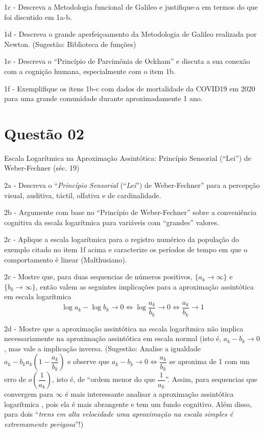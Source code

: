     1c - Descreva a Metodologia funcional de Galileo e justifique-a em termos do que foi discutido em 1a-b.

    1d - Descreva o grande aperfeiçoamento da Metodologia de Galileo realizada por Newton. (Sugestão: Biblioteca de funções)

    1e - Descreva o ``Princípio de Parcimônia de Ockham'' e discuta a sua conexão com a cognição humana, especialmente com o item 1b.

    1f - Exemplifique os itens 1b-c com dados de mortalidade da COVID19 em 2020 para uma grande comunidade durante aproximadamente 1 ano.






\section*{Questão 02}



Escala Logarítmica na Aproximação Assintótica: Princípio Sensorial (``Lei'') de
Weber-Fechner (séc. 19)

    2a - Descreva o ``\textit{Princípio Sensorial} (``\textit{Lei}'') de Weber-Fechner'' para a percepção visual, auditiva, táctil, olfativa e de cardinalidade.

    2b - Argumente com base no ``Princípio de Weber-Fechner'' sobre a conveniência cognitiva da escala logarítmica para variáveis com ``grandes'' valores.
    
    2c - Aplique a escala logarítmica para o registro numérico da população do exemplo citado no item 1f acima e caracterize os períodos de tempo em que o comportamento é linear (Malthusiano).

    2c - Mostre que, para duas sequencias de números positivos, \(\{a_k \to \infty\}\) e \(\{b_k \to \infty\}\), então valem as seguintes implicações para a aproximação assintótica em escala logarítmica
    \[\log a_k - \log b_k \to 0 \Leftrightarrow \log \dfrac{a_k}{b_k} \to 0 \Leftrightarrow \dfrac{a_k}{b_k} \to 1\]

    2d - Mostre que a aproximação assintótica na escala logarítmica  não implica necessariamente na aproximação assintótica em escala normal (isto é, \(a_k - b_k \to 0\), mas vale a implicação inversa. (Sugestão: Analise a igualdade \(a_k - b_k  a_k \left(1 - \dfrac{a_k}{b_k}\right)\) e observe que \(a_k - b_k \to 0 \Leftrightarrow \dfrac{a_k}{b_k}\) se aproxima de 1 com um erro de \(o\left(\dfrac{1}{a_k}\right)\), isto é, de ``ordem menor do que \(\dfrac{1}{a_k}\)''. Assim, para sequencias que convergem para \(\infty\) é mais interessante analisar a aproximação assintótica logarítmica , pois ela é mais abrangente e tem um fundo cognitivo. Além disso, para dois ``\textit{trens em alta velocidade uma aproximação na escala simples é extremamente perigosa}''!)

